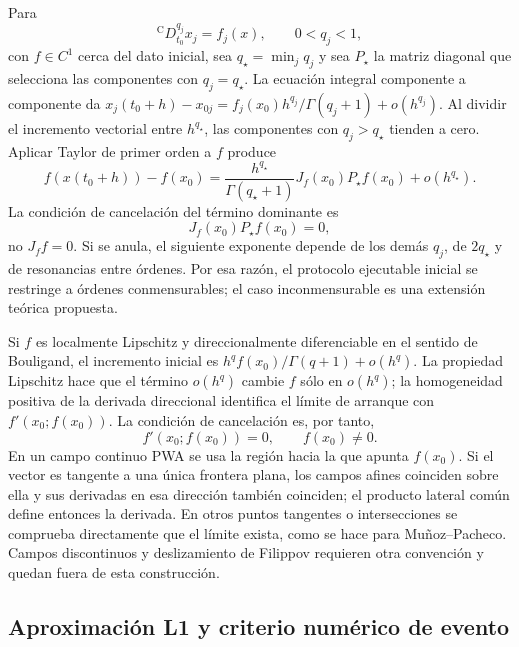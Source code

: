Para
\begin{equation}
 {}^{\mathrm C}D_{t_0}^{q_j}x_j=f_j(x),\qquad 0<q_j<1,
 \label{eq:pp-incommensurate}
\end{equation}
con \(f\in C^1\) cerca del dato inicial, sea \(q_\star=\min_jq_j\) y
sea \(P_\star\) la matriz diagonal que selecciona
las componentes con \(q_j=q_\star\). La ecuación integral componente a
componente da
\(x_j(t_0+h)-x_{0j}=f_j(x_0)h^{q_j}/\Gamma(q_j+1)+o(h^{q_j})\).
Al dividir el incremento vectorial entre \(h^{q_\star}\), las componentes
con \(q_j>q_\star\) tienden a cero. Aplicar Taylor de primer orden a
\(f\) produce
\begin{equation}
 f(x(t_0+h))-f(x_0)
 =\frac{h^{q_\star}}{\Gamma(q_\star+1)}
 J_f(x_0)P_\star f(x_0)+o(h^{q_\star}).
 \label{eq:pp-incommensurate-leading}
\end{equation}
La condición de cancelación del término dominante es
\begin{equation}
 J_f(x_0)P_\star f(x_0)=0,
 \label{eq:pp-incommensurate-condition}
\end{equation}
no \(J_f f=0\). Si se anula, el siguiente exponente depende de los demás
\(q_j\), de \(2q_\star\) y de resonancias entre órdenes. Por esa razón, el
protocolo ejecutable inicial se restringe a órdenes conmensurables; el caso
inconmensurable es una extensión teórica propuesta.

Si \(f\) es localmente Lipschitz y direccionalmente diferenciable en el
sentido de Bouligand, el incremento inicial es
\(h^q f(x_0)/\Gamma(q+1)+o(h^q)\). La propiedad Lipschitz hace que
el término \(o(h^q)\) cambie \(f\) sólo en \(o(h^q)\); la homogeneidad
positiva de la derivada direccional identifica el límite de arranque con
\(f'(x_0;f(x_0))\). La condición de cancelación es, por tanto,
\begin{equation}
 f'(x_0;f(x_0))=0,\qquad f(x_0)\neq0.
 \label{eq:pp-bouligand}
\end{equation}
En un campo continuo PWA se usa la región hacia la que apunta \(f(x_0)\).
Si el vector es tangente a una única frontera plana, los campos afines
coinciden sobre ella y sus derivadas en esa dirección también coinciden;
el producto lateral común define entonces la derivada. En otros puntos
tangentes o intersecciones se comprueba directamente que el límite exista,
como se hace para Muñoz--Pacheco. Campos discontinuos y deslizamiento de
Filippov requieren otra convención y quedan fuera de esta construcción.

\subsection{Aproximación L1 y criterio numérico de evento}

